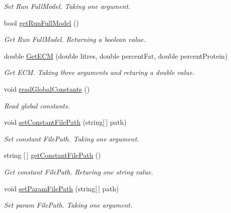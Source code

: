 \begin{DoxyCompactItemize}
\begin{DoxyCompactList}\small\item\em Set Run Full\+Model. Taking one argument. \end{DoxyCompactList}\item 
bool \mbox{\hyperlink{class_global_vars_a62e98fc98cd491dedbd0e83db9584da2}{get\+Run\+Full\+Model}} ()
\begin{DoxyCompactList}\small\item\em Get Run Full\+Model. Returning a boolean value. \end{DoxyCompactList}\item 
double \mbox{\hyperlink{class_global_vars_a144881e0bebc34254f34b96109f0005d}{Get\+E\+CM}} (double litres, double percent\+Fat, double percent\+Protein)
\begin{DoxyCompactList}\small\item\em Get E\+CM. Taking three arguments and returing a double value. \end{DoxyCompactList}\item 
void \mbox{\hyperlink{class_global_vars_aa2b488457aa6dc34540b3649edd85d82}{read\+Global\+Constants}} ()
\begin{DoxyCompactList}\small\item\em Read global constants. \end{DoxyCompactList}\item 
void \mbox{\hyperlink{class_global_vars_a5fc99c8171c0e838561fe0e85778588a}{set\+Constant\+File\+Path}} (string\mbox{[}$\,$\mbox{]} path)
\begin{DoxyCompactList}\small\item\em Set constant File\+Path. Taking one argument. \end{DoxyCompactList}\item 
string \mbox{[}$\,$\mbox{]} \mbox{\hyperlink{class_global_vars_ae5a4efdbf57ef0076ec3cb07af28d6fe}{get\+Constant\+File\+Path}} ()
\begin{DoxyCompactList}\small\item\em Get constant File\+Path. Returing one string value. \end{DoxyCompactList}\item 
void \mbox{\hyperlink{class_global_vars_a600488f35519b3e549b8160de9fff555}{set\+Param\+File\+Path}} (string\mbox{[}$\,$\mbox{]} path)
\begin{DoxyCompactList}\small\item\em Set param File\+Path. Taking one argument. \end{DoxyCompactList}\item 

\end{DoxyCompactItemize}

